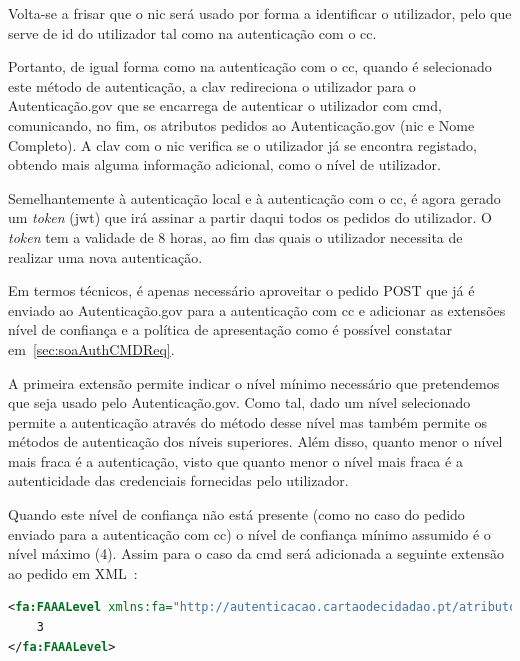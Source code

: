 Volta-se a frisar que o \acrshort{nic} será usado por forma a identificar o utilizador, 
pelo que serve de id do utilizador tal como na autenticação com o \acrshort{cc}.

Portanto, de igual forma como na autenticação com o \acrshort{cc}, quando é selecionado este método de autenticação,
 a \acrshort{clav} redireciona o utilizador para o Autenticação.gov que se encarrega de autenticar o utilizador 
 com \acrshort{cmd}, comunicando, no fim, os atributos pedidos ao Autenticação.gov (\acrshort{nic} e Nome Completo).
  A \acrshort{clav} com o \acrshort{nic} verifica se o utilizador já se encontra registado, obtendo mais alguma 
  informação adicional, como o nível de utilizador. 
  
  Semelhantemente à autenticação local e à autenticação com o \acrshort{cc}, é agora gerado um \textit{token} 
  (\acrshort{jwt}) que irá assinar a partir daqui todos os pedidos do utilizador. O \textit{token} tem a validade 
  de 8 horas, ao fim das quais o utilizador necessita de realizar uma nova autenticação.

Em termos técnicos, é apenas necessário aproveitar o pedido POST que já é enviado ao Autenticação.gov para a 
autenticação com \acrshort{cc} e adicionar as extensões nível de confiança e a política de apresentação como 
é possível constatar em~\ref{sec:soaAuthCMDReq}.

A primeira extensão permite indicar o nível mínimo necessário que pretendemos que seja usado pelo Autenticação.gov. 
Como tal, dado um nível selecionado permite a autenticação através do método desse nível mas também permite os 
métodos de autenticação dos níveis superiores. Além disso, quanto menor o nível mais fraca é a autenticação, 
visto que quanto menor o nível mais fraca é a autenticidade das credenciais fornecidas pelo utilizador.

Quando este nível de confiança não está presente (como no caso do pedido enviado para a autenticação 
com \acrshort{cc}) o nível de confiança mínimo assumido é o nível máximo (4). Assim para o caso da \acrshort{cmd} 
será adicionada a seguinte extensão ao pedido em XML~\cite{agov2}:
\begin{lstlisting}[language=xml, caption=Extensão Nível de Confiança no pedido enviado ao Autenticação.gov]
<fa:FAAALevel xmlns:fa="http://autenticacao.cartaodecidadao.pt/atributos">
    3
</fa:FAAALevel>
\end{lstlisting}

